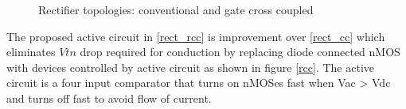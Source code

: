 \documentclass[12pt,a4paper,UKenglish]{article}
\begin{document}
\begin{figure} [htbp]
  \centering 
\hfill
 \caption{Rectifier topologies: conventional and gate cross coupled} 
\label{rect_conv_cc} 
\end{figure}

The proposed active circuit in \ref{rect_rcc} is improvement over \ref{rect_cc} which eliminates $Vtn$ drop required for conduction by replacing diode connected nMOS with devices controlled by active circuit as shown in figure \ref{rcc}. The active circuit is a four input comparator that turns on nMOSes fast when Vac > Vdc and turns off fast to avoid flow of current. \\
\end{document}
